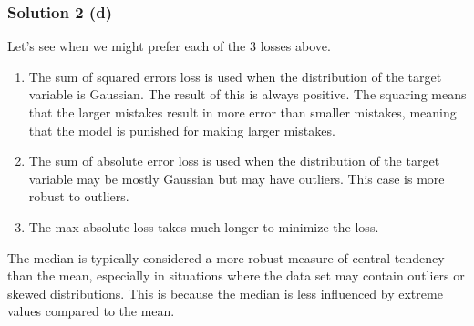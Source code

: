 \documentclass{assignment}
\begin{document}
\begin{problem}
\subsubsection*{Solution 2 (d)}
\noindent Let's see when we might prefer each of the 3 losses above.
\begin{enumerate}
    \item The sum of squared errors loss is used when the distribution of the target variable is Gaussian. The result of this is always positive. The squaring means that the larger mistakes result in more error than smaller mistakes, meaning that the model is punished for making larger mistakes.
    \item The sum of absolute error loss is used when the distribution of the target variable may be mostly Gaussian but may have outliers. 
    This case is more robust to outliers.
    \item The max absolute loss takes much longer to minimize the loss.
\end{enumerate}
The median is typically considered a more robust measure of central tendency than the mean, especially in situations where the data set may contain outliers or skewed distributions. This is because the median is less influenced by extreme values compared to the mean.
 

\end{problem}
\end{document}
